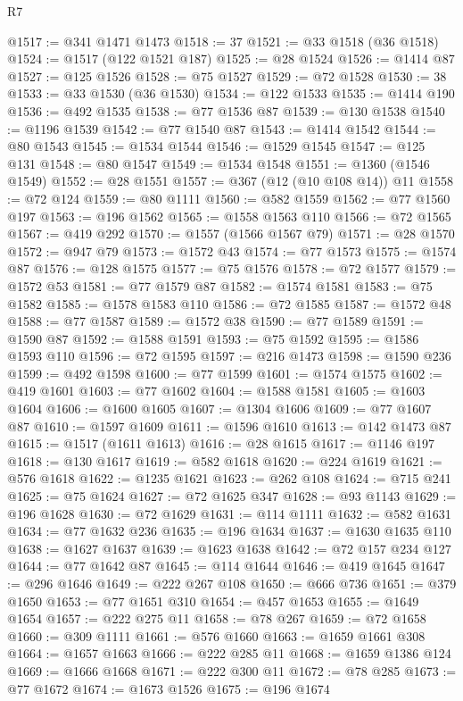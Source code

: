 \begin{lexlean}{R7}
\begin{coremodule}
@1517 := @341 @1471 @1473
@1518 := 37
@1521 := @33 @1518 (@36 @1518)
@1524 := @1517 (@122 @1521 @187)
@1525 := @28 @1524
@1526 := @1414 @87
@1527 := @125 @1526
@1528 := @75 @1527
@1529 := @72 @1528
@1530 := 38
@1533 := @33 @1530 (@36 @1530)
@1534 := @122 @1533
@1535 := @1414 @190
@1536 := @492 @1535
@1538 := @77 @1536 @87
@1539 := @130 @1538
@1540 := @1196 @1539
@1542 := @77 @1540 @87
@1543 := @1414 @1542
@1544 := @80 @1543
@1545 := @1534 @1544
@1546 := @1529 @1545
@1547 := @125 @131
@1548 := @80 @1547
@1549 := @1534 @1548
@1551 := @1360 (@1546 @1549)
@1552 := @28 @1551
@1557 := @367 (@12 (@10 @108 @14)) @11
@1558 := @72 @124
@1559 := @80 @1111
@1560 := @582 @1559
@1562 := @77 @1560 @197
@1563 := @196 @1562
@1565 := @1558 @1563 @110
@1566 := @72 @1565
@1567 := @419 @292
@1570 := @1557 (@1566 @1567 @79)
@1571 := @28 @1570
@1572 := @947 @79
@1573 := @1572 @43
@1574 := @77 @1573
@1575 := @1574 @87
@1576 := @128 @1575
@1577 := @75 @1576
@1578 := @72 @1577
@1579 := @1572 @53
@1581 := @77 @1579 @87
@1582 := @1574 @1581
@1583 := @75 @1582
@1585 := @1578 @1583 @110
@1586 := @72 @1585
@1587 := @1572 @48
@1588 := @77 @1587
@1589 := @1572 @38
@1590 := @77 @1589
@1591 := @1590 @87
@1592 := @1588 @1591
@1593 := @75 @1592
@1595 := @1586 @1593 @110
@1596 := @72 @1595
@1597 := @216 @1473
@1598 := @1590 @236
@1599 := @492 @1598
@1600 := @77 @1599
@1601 := @1574 @1575
@1602 := @419 @1601
@1603 := @77 @1602
@1604 := @1588 @1581
@1605 := @1603 @1604
@1606 := @1600 @1605
@1607 := @1304 @1606
@1609 := @77 @1607 @87
@1610 := @1597 @1609
@1611 := @1596 @1610
@1613 := @142 @1473 @87
@1615 := @1517 (@1611 @1613)
@1616 := @28 @1615
@1617 := @1146 @197
@1618 := @130 @1617
@1619 := @582 @1618
@1620 := @224 @1619
@1621 := @576 @1618
@1622 := @1235 @1621
@1623 := @262 @108
@1624 := @715 @241
@1625 := @75 @1624
@1627 := @72 @1625 @347
@1628 := @93 @1143
@1629 := @196 @1628
@1630 := @72 @1629
@1631 := @114 @1111
@1632 := @582 @1631
@1634 := @77 @1632 @236
@1635 := @196 @1634
@1637 := @1630 @1635 @110
@1638 := @1627 @1637
@1639 := @1623 @1638
@1642 := @72 @157 @234 @127
@1644 := @77 @1642 @87
@1645 := @114 @1644
@1646 := @419 @1645
@1647 := @296 @1646
@1649 := @222 @267 @108
@1650 := @666 @736
@1651 := @379 @1650
@1653 := @77 @1651 @310
@1654 := @457 @1653
@1655 := @1649 @1654
@1657 := @222 @275 @11
@1658 := @78 @267
@1659 := @72 @1658
@1660 := @309 @1111
@1661 := @576 @1660
@1663 := @1659 @1661 @308
@1664 := @1657 @1663
@1666 := @222 @285 @11
@1668 := @1659 @1386 @124
@1669 := @1666 @1668
@1671 := @222 @300 @11
@1672 := @78 @285
@1673 := @77 @1672
@1674 := @1673 @1526
@1675 := @196 @1674

\end{coremodule}
\end{lexlean}
